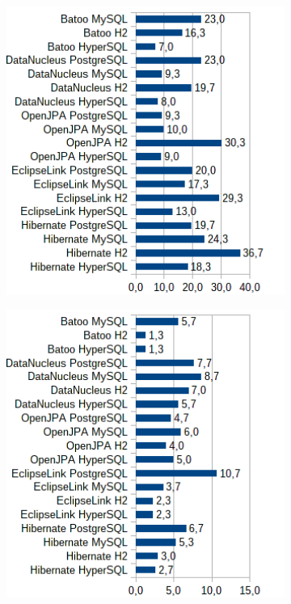 \begin{figure}
\begin{subfigure}[b]{1\textwidth}
\includegraphics[width=25em]{obr/bench/jpa7}
\end{subfigure}
\begin{subfigure}[b]{1\textwidth}
\includegraphics[width=25em]{obr/bench/jpa8}
\end{subfigure}
\end{figure}

